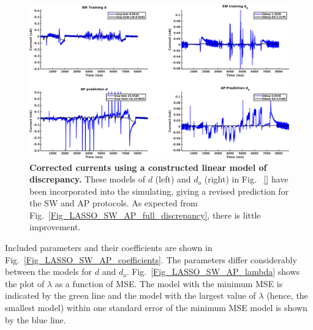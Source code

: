 \documentclass[11pt,a4paper,oneside]{article}
\begin{document}
\begin{figure}[hbt]
\begin{center}
\includegraphics[scale=0.42]{Figures/LASSO_SW_AP_full_discrepancy.png}
\caption{\textbf{Corrected currents using a constructed linear model of discrepancy.} These models of $d$ (left) and $d_o$ (right) in Fig. ~\ref{} have been incorporated into the simulating, giving a revised prediction for the SW and AP protocols. As expected from Fig.~\ref{Fig_LASSO_SW_AP_full_discrepancy}, there is little improvement.}
\label{Fig_LASSO_SW_AP_full_currents}
\end{center}
\end{figure}

Included parameters and their coefficients are shown in Fig.~\ref{Fig_LASSO_SW_AP_coefficients}. The parameters differ considerably between the models for $d$ and $d_o$. Fig.~\ref{Fig_LASSO_SW_AP_lambda} shows the plot of $\lambda$ as a function of MSE. The model with the minimum MSE is indicated by the green line and the model with the largest value of $\lambda$ (hence, the smallest model) within one standard error of the minimum MSE model is shown by the blue line. 
\end{document}

